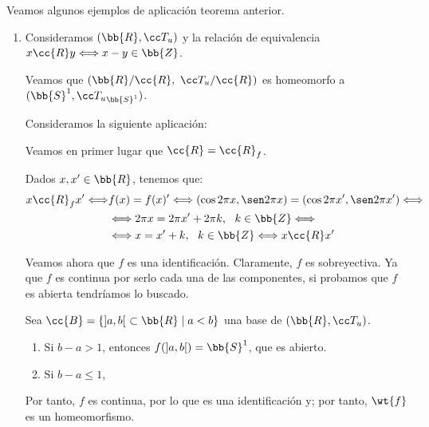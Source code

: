 \begin{ejemplo} Veamos algunos ejemplos de aplicación teorema anterior.
    \begin{enumerate}
        \item Consideramos $(\bb{R},\T_u)$ y la relación de equivalencia $x\cc{R}y\Longleftrightarrow x-y\in\bb{Z}$.

        Veamos que $(\bb{R}/\cc{R},~ \T_u/\cc{R})$ es homeomorfo a $(\bb{S}^1,{\T_{u}}_{\bb{S}^1})$.

        Consideramos la siguiente aplicación:

        Veamos en primer lugar que $\cc{R}=\cc{R}_f$.

        Dados $x,x'\in \bb{R}$, tenemos que:
        \begin{equation*}
            \begin{split}
                x\cc{R}_fx' \Longleftrightarrow &f(x)=f(x)' \Longleftrightarrow
                \left(\cos 2\pi x, \sen 2\pi x\right) = \left(\cos 2\pi x', \sen 2\pi x'\right) \Longleftrightarrow \\
                &\Longleftrightarrow 2\pi x = 2\pi x' + 2\pi k,~~k\in \bb{Z}
                \Longleftrightarrow \\
                &\Longleftrightarrow  x = x' + k,~~k\in \bb{Z} 
                \Longleftrightarrow x\cc{R}x'
            \end{split}
        \end{equation*}

        Veamos ahora que $f$ es una identificación. Claramente, $f$ es sobreyectiva. Ya que $f$ es continua por serlo cada una de las componentes, si probamos que $f$ es abierta tendríamos lo buscado.

        Sea $\cc{B} = \{]a,b[~\subset \bb{R}\mid a<b\}$ una base de $(\bb{R}, \T_u)$.
        \begin{enumerate}
            \item Si $b-a>1$, entonces $f(]a,b[) = \bb{S}^1$, que es abierto.

            \item Si $b-a\leq 1$, %
        \end{enumerate}
        Por tanto, $f$ es continua, por lo que es una identificación y; por tanto, $\wt{f}$ es un homeomorfismo.
    \end{enumerate}
\end{ejemplo}


